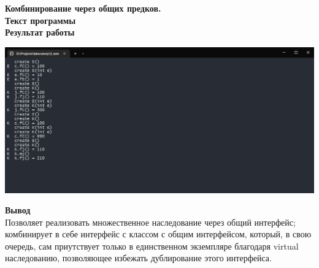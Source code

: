\documentclass[12pt]{report}
\begin{document}
    \textbf{\large{Комбинирование через общих предков.}}\\
    \textbf{Текст программы}\\
    
    \vspace{0.4in}
    \textbf{Результат работы}\\
    \begin{center}
        \includegraphics[scale=0.5]{formal/lab_5.png}\\
    \end{center}
    \textbf{Вывод}\\
    Позволяет реализовать множественное наследование через общий интерфейс; 
    комбинирует в себе интерфейс с классом с общим интерфейсом, который, в свою очередь, 
    сам приутствует только в единственном экземпляре благодаря virtual наследованию, 
    позволяющее избежать дублирование этого интерфейса.
\end{document}

